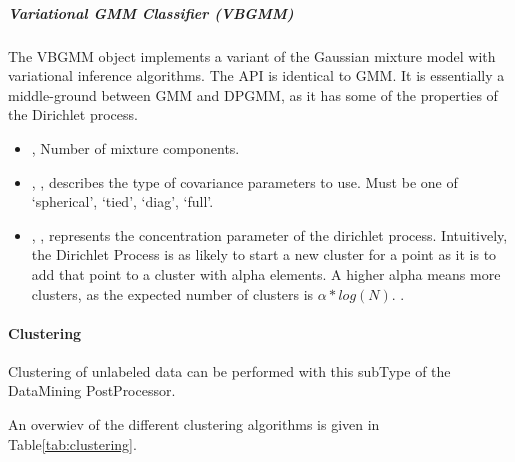 \subparagraph{ Variational GMM Classifier (VBGMM)} \hfill
\label{subparagraph:VBGMM}

The VBGMM object implements a variant of the Gaussian mixture model
 with variational inference algorithms. The API is identical to GMM.
 It is essentially a middle-ground between GMM and DPGMM, as it has
some of the properties of the Dirichlet process.

\begin{itemize}
	\item {},  Number of mixture components. 
	\item {}, , describes the type of covariance parameters to use.
Must be one of ‘spherical’, ‘tied’, ‘diag’, ‘full’. 
	\item {}, ,
represents the concentration parameter of the dirichlet process.
Intuitively, the Dirichlet Process is as likely to start a new cluster
 for a point as it is to add that point to a cluster with alpha
 elements. A higher alpha means more clusters, as the expected
number of clusters is ${\alpha*log(N)}$. .
\end{itemize}

\paragraph{ Clustering }
\label{paragraph:Clustering}

Clustering of unlabeled data can be performed with this subType of
 the DataMining PostProcessor.

An overwiev of the different clustering algorithms is given in
Table\ref{tab:clustering}.

